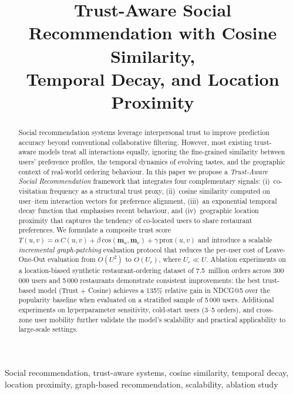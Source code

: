 \documentclass[conference]{IEEEtran}
\title{Trust-Aware Social Recommendation with Cosine Similarity,\\
       Temporal Decay, and Location Proximity}
\author{
  \IEEEauthorblockN{Author Name}
  \IEEEauthorblockA{Department of Computer Science\\
  University Name\\
  City, Country\\
  email@university.edu}
}
\begin{document}
\maketitle

\begin{abstract}
Social recommendation systems leverage interpersonal trust to improve
prediction accuracy beyond conventional collaborative filtering.  However,
most existing trust-aware models treat all interactions equally, ignoring
the fine-grained similarity between users' preference profiles, the
temporal dynamics of evolving tastes, and the geographic context of
real-world ordering behaviour.  In this paper we propose a
\emph{Trust-Aware Social Recommendation} framework that integrates four
complementary signals: (i)~co-visitation frequency as a structural trust
proxy, (ii)~cosine similarity computed on user--item interaction vectors
for preference alignment, (iii)~an exponential temporal decay function
that emphasises recent behaviour, and (iv)~geographic location proximity
that captures the tendency of co-located users to share restaurant
preferences.  We formulate a composite trust score
$T(u,v) = \alpha\,C(u,v) + \beta\,\text{cos}(\mathbf{m}_u,\mathbf{m}_v)
+ \gamma\,\text{prox}(u,v)$
and introduce a scalable \emph{incremental graph-patching} evaluation
protocol that reduces the per-user cost of Leave-One-Out evaluation from
$O(U^2)$ to $O(U_r)$, where $U_r \ll U$.  Ablation experiments on a
location-biased synthetic restaurant-ordering dataset of 7.5~million
orders across 300\,000 users and 5\,000 restaurants demonstrate
consistent improvements: the best trust-based model (Trust + Cosine)
achieves a 135\% relative gain in NDCG@5 over the popularity baseline
when evaluated on a stratified sample of 5\,000 users.  Additional
experiments on hyperparameter sensitivity, cold-start users (3--5
orders), and cross-zone user mobility further validate the model's
scalability and practical applicability to large-scale settings.
\end{abstract}

\begin{IEEEkeywords}
Social recommendation, trust-aware systems, cosine similarity, temporal
decay, location proximity, graph-based recommendation, scalability,
ablation study
\end{IEEEkeywords}

\end{document}
